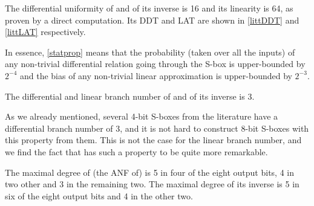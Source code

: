 \begin{prop}
\label{statprop}
The differential uniformity of \littlunOne and of its inverse is 16 and its linearity is 64, as proven by a direct computation.
Its DDT and LAT are shown in \autoref{littDDT} and \autoref{littLAT} respectively.
\end{prop}

In essence, \autoref{statprop} means that the probability (taken over all the inputs) of any non-trivial differential relation going through
the S-box is upper-bounded by $2^{-4}$ and the bias of any non-trivial linear approximation is upper-bounded by $2^{-3}$.

\begin{prop}
The differential and linear branch number of \littlunOne and of its inverse is 3.
\end{prop}

As we already mentioned, several 4-bit S-boxes from the literature have a differential branch number of 3, and it is not hard to construct
8-bit S-boxes with this property from them. This is not the case for the linear branch number, and we find the fact that \littlunOne
has such a property to be quite more remarkable.

\begin{prop}
The maximal degree of (the ANF of) \littlunOne is 5 in four of the eight output bits,
4 in two other and 3 in the remaining two. The maximal degree of its inverse is 5 in six of the eight output bits
and 4 in the other two.
\end{prop}




